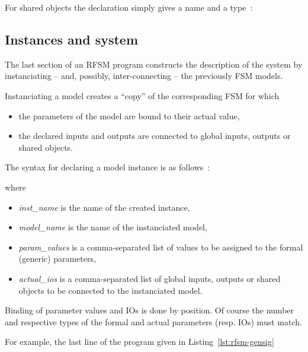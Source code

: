 \step For shared objects the declaration simply gives a name and a type~:

\begin{center}
\end{center}

\subsection{Instances and system}
\label{sec:fsm-instances}

The last section of an RFSM program constructs the description of the system by instanciating
-- and, possibly, inter-connecting -- the previously FSM models.

\medskip
Instanciating a model creates a ``copy'' of the corresponding FSM for which
\begin{itemize}
\item the parameters of the model are bound to their actual value,
\item the declared inputs and outputs are connected to global inputs, outputs or shared
  objects.
\end{itemize}

\medskip
The syntax for declaring a model instance is as follows~:

\begin{center}
\end{center}

where
\begin{itemize}
\item \emph{inst\_name} is the name of the created instance,
\item \emph{model\_name} is the name of the instanciated model,
\item \emph{param\_values} is a comma-separated list of values to be assigned to the formal
  (generic) parameters,
\item \emph{actual\_ios} is a comma-separated list of global inputs, outputs or shared objects to be
  connected to the instanciated model.
\end{itemize}

Binding of parameter values and IOs is done by position. Of course the number and respective types
of the formal and actual parameters (resp. IOs) must match.

\medskip
For example, the last line of the program given in Listing~\ref{lst:rfsm-gensig}

